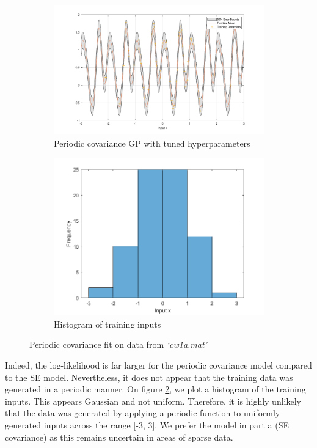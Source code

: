 \documentclass[]{article}
\begin{document}
\begin{figure}[!h]
	\begin{subfigure}{0.5\linewidth}
		\centering
		\includegraphics[width=\linewidth]{1c}
		\caption{Periodic covariance GP with tuned hyperparameters}
		\label{fig:1c}
	\end{subfigure}
	\begin{subfigure}{0.5\linewidth}
		\centering
		\includegraphics[width=\linewidth]{1c1}
		\caption{Histogram of training inputs}
		\label{fig:1c1}
	\end{subfigure}
	\caption{Periodic covariance fit on data from \textit{`cw1a.mat'}}
	\label{fig:1c-comb}
\end{figure}

Indeed, the log-likelihood is far larger for the periodic covariance model compared to the SE model. Nevertheless, it does not appear that the training data was generated in a periodic manner. On figure \ref{fig:1c1}, we plot a histogram of the training inputs. This appears Gaussian and not uniform. Therefore, it is highly unlikely that the data was generated by applying a periodic function to uniformly generated inputs across the range [-3, 3]. We prefer the model in part a (SE covariance) as this remains uncertain in areas of sparse data.
\end{document}
